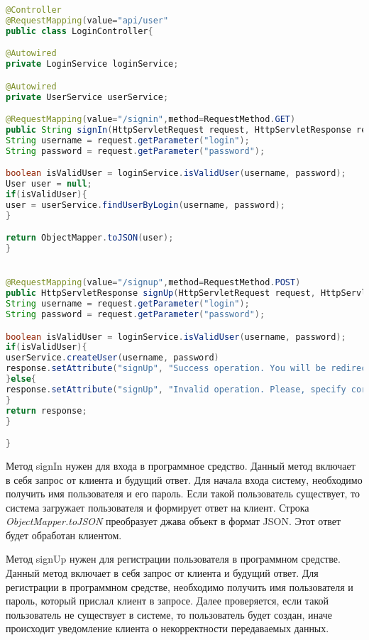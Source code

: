 \begin{lstlisting}[language=Java, style=rubystyle, caption={Определение LoginController}, label=lst:arch_and_mod:Service3]
@Controller
@RequestMapping(value="api/user"
public class LoginController{

@Autowired
private LoginService loginService;

@Autowired
private UserService userService;

@RequestMapping(value="/signin",method=RequestMethod.GET)
public String signIn(HttpServletRequest request, HttpServletResponse response){
String username = request.getParameter("login");
String password = request.getParameter("password");

boolean isValidUser = loginService.isValidUser(username, password);
User user = null;
if(isValidUser){
user = userService.findUserByLogin(username, password);
}

return ObjectMapper.toJSON(user);
}


@RequestMapping(value="/signup",method=RequestMethod.POST)
public HttpServletResponse signUp(HttpServletRequest request, HttpServletResponse response) {
String username = request.getParameter("login");
String password = request.getParameter("password");

boolean isValidUser = loginService.isValidUser(username, password);
if(isValidUser){
userService.createUser(username, password)
response.setAttribute("signUp", "Success operation. You will be redirected to sign in page!");
}else{ 
response.setAttribute("signUp", "Invalid operation. Please, specify correct usernamge, email!");
}
return response;
}

}
\end{lstlisting}

Метод signIn нужен для входа в программное средство. Данный метод включает в себя запрос от клиента и будущий ответ. Для начала входа систему, необходимо получить имя пользователя и его пароль. Если такой пользователь существует, то система загружает пользователя и формирует ответ на клиент. Строка \textit{ObjectMapper.toJSON} преобразует джава объект в формат JSON. Этот ответ будет обработан клиентом. 

Метод signUp нужен для регистрации пользователя в программном средстве.  Данный метод включает в себя запрос от клиента и будущий ответ. Для регистрации в программном средстве, необходимо получить имя пользователя и  пароль, который прислал клиент в запросе. Далее проверяется, если такой пользователь не существует в системе, то пользователь будет создан, иначе происходит уведомление клиента о некорректности передаваемых данных.


